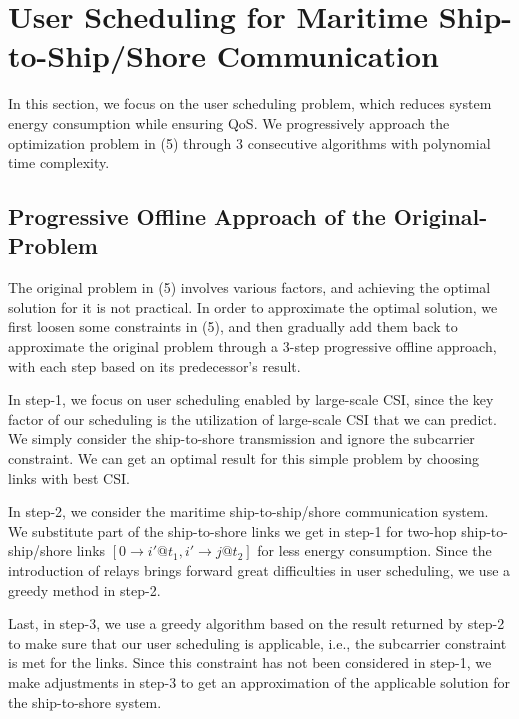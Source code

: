 \documentclass[conference]{IEEEtran}
\begin{document}
 \section{User Scheduling for Maritime Ship-to-Ship/Shore Communication}\label{sec:3}
 
 In this section, we focus on the user scheduling problem, which reduces system energy consumption while ensuring QoS. We progressively approach the optimization problem in (5) through 3 consecutive algorithms with polynomial time complexity.
 
 
 \subsection{Progressive Offline Approach of the Original-Problem}
 
 The original problem in (5) involves various factors, and achieving the optimal solution for it is not practical. 
 In order to approximate the optimal solution, we first loosen some constraints in (5), and then gradually add them back to approximate the original problem through a 3-step progressive offline approach, with each step based on its predecessor's result. 
 
 In step-1, we focus on user scheduling enabled by large-scale CSI, since the key factor of our scheduling is the utilization of large-scale CSI that we can predict. We simply consider the ship-to-shore transmission and ignore the subcarrier constraint. We can get an optimal result for this simple problem by choosing links with best CSI. 
 
 In step-2, we consider the maritime ship-to-ship/shore communication system. We substitute part of the ship-to-shore links we get in step-1 for two-hop ship-to-ship/shore links $\left[ {0 \to i'@{t_1},i' \to j@{t_2}} \right]$ for less energy consumption. Since the introduction of relays brings forward great difficulties in user scheduling, we use a greedy method in step-2. 
 
 Last, in step-3, we use a greedy algorithm based on the result returned by step-2 to make sure that our user scheduling is applicable, i.e., the subcarrier constraint is met for the links. Since this constraint has not been considered in step-1, we make adjustments in step-3 to get an approximation of the applicable solution for the ship-to-shore system. 
\end{document}
